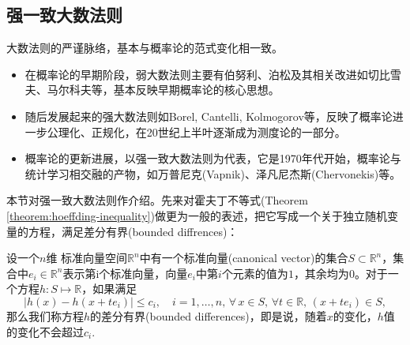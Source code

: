 \subsection{强一致大数法则}
\label{sec:lln-sulln}

大数法则的严谨脉络，基本与概率论的范式变化相一致。
\begin{itemize}
\item 在概率论的早期阶段，弱大数法则主要有伯努利、泊松及其相关改进如切比雪夫、马尔科夫等，基本反映早期概率论的核心思想。

\item 随后发展起来的强大数法则如Borel, Cantelli, Kolmogorov等，反映了概率论进一步公理化、正规化，在20世纪上半叶逐渐成为测度论的一部分。

\item 概率论的更新进展，以强一致大数法则为代表，它是1970年代开始，概率论与统计学习相交融的产物，如万普尼克(Vapnik)、泽凡尼杰斯(Chervonekis)等。
\end{itemize}

本节对强一致大数法则作介绍。先来对霍夫丁不等式(Theorem \ref{theorem:hoeffding-inequality})做更为一般的表述，把它写成一个关于独立随机变量的方程，满足差分有界(bounded diffrences)：

\begin{definition}[差分有界]
  \label{definition:bounded-diff}
  设一个$n$维
  标准向量空间$\mathbb{R}^{n}$中有一个标准向量(canonical vector)的集合$S \subset \mathbb{R}^{n}$，集合中$e_{i} \in \mathbb{R}^{n}$表示第i个标准向量，向量$e_{i}$中第$i$个元素的值为$1$，其余均为$0$。对于一个方程$h:S \mapsto \mathbb{R}$，如果满足
  \begin{equation}
    \label{eq:lln-sulln-bounded-diff}
    \left| h(x) - h(x + t e_{i}) \right| \le c_{i}, \quad i=1,\ldots,n, \, \forall \, x \in S, \, \forall t \in \mathbb{R}, \, \left( x + t e_{i} \right) \in S,
  \end{equation}
  那么我们称方程$h$的差分有界(bounded differences)，即是说，随着$x$的变化，$h$值的变化不会超过$c_{i}$.
\end{definition}

